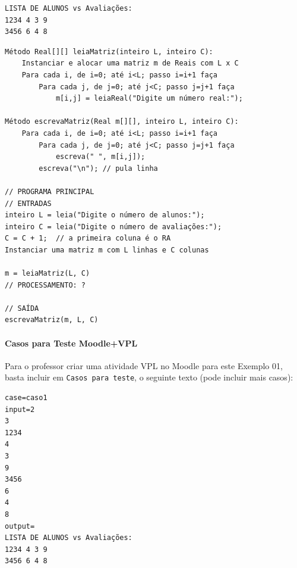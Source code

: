 \documentclass[12pt,a4paper]{article}
\begin{document}
\begin{verbatim}
LISTA DE ALUNOS vs Avaliações:
1234 4 3 9
3456 6 4 8
\end{verbatim}

    \begin{verbatim}
Método Real[][] leiaMatriz(inteiro L, inteiro C):
    Instanciar e alocar uma matriz m de Reais com L x C
    Para cada i, de i=0; até i<L; passo i=i+1 faça
        Para cada j, de j=0; até j<C; passo j=j+1 faça
            m[i,j] = leiaReal("Digite um número real:");

Método escrevaMatriz(Real m[][], inteiro L, inteiro C):
    Para cada i, de i=0; até i<L; passo i=i+1 faça
        Para cada j, de j=0; até j<C; passo j=j+1 faça
            escreva(" ", m[i,j]);
        escreva("\n"); // pula linha

// PROGRAMA PRINCIPAL
// ENTRADAS
inteiro L = leia("Digite o número de alunos:");
inteiro C = leia("Digite o número de avaliações:");
C = C + 1;  // a primeira coluna é o RA
Instanciar uma matriz m com L linhas e C colunas

m = leiaMatriz(L, C)
// PROCESSAMENTO: ?

// SAÍDA
escrevaMatriz(m, L, C)
\end{verbatim}

    \hypertarget{casos-para-teste-moodlevpl}{%
\paragraph{Casos para Teste
Moodle+VPL}\label{casos-para-teste-moodlevpl}}

Para o professor criar uma atividade VPL no Moodle para este Exemplo 01,
basta incluir em \texttt{Casos\ para\ teste}, o seguinte texto (pode
incluir mais casos):

\begin{verbatim}
case=caso1
input=2
3
1234
4
3
9
3456
6
4
8
output=
LISTA DE ALUNOS vs Avaliações:
1234 4 3 9
3456 6 4 8
\end{verbatim}
\end{document}
